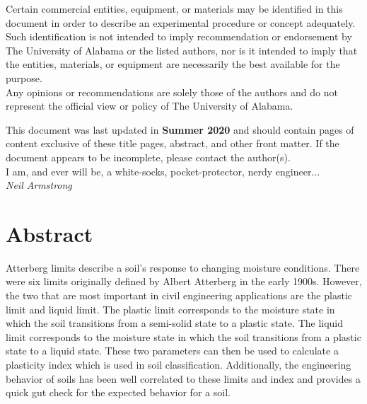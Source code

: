 \documentclass[12pt]{article}
\newcommand{\LastUpdate}{Summer 2020}
\begin{document}
\begin{titlepage}
\begin{center}
\normalsize 
Certain commercial entities, equipment, or materials may be identified in this document in order to describe an experimental procedure or concept adequately. Such identification is not intended to imply recommendation or endorsement by The University of Alabama or the listed authors, nor is it intended to imply that the entities, materials, or equipment are necessarily the best available for the purpose.\\

\vfill
Any opinions or recommendations are solely those of the authors and do not represent the official view or policy of The University of Alabama.
\end{center}
\begin{flushright}
\vfill
\normalsize 
This document was last updated in \textbf{\LastUpdate} and should contain \textbf{\pageref{LastPage}} pages of content exclusive of these title pages, abstract, and other front matter. If the document appears to be incomplete, please contact the author(s).\\
\vfill
I am, and ever will be, a white-socks, pocket-protector, nerdy engineer...\\
\textit{Neil Armstrong}
\end{flushright}
\end{titlepage}
\section*{Abstract}
\normalsize Atterberg limits describe a soil's response to changing moisture conditions. There were six limits originally defined by Albert Atterberg in the early 1900s. However, the two that are most important in civil engineering applications are the plastic limit and liquid limit. The plastic limit corresponds to the moisture state in which the soil transitions from a semi-solid state to a plastic state. The liquid limit corresponds to the moisture state in which the soil transitions from a plastic state to a liquid state. These two parameters can then be used to calculate a plasticity index which is used in soil classification. Additionally, the engineering behavior of soils has been well correlated to these limits and index and provides a quick gut check for the expected behavior for a soil.\\
\end{document}
